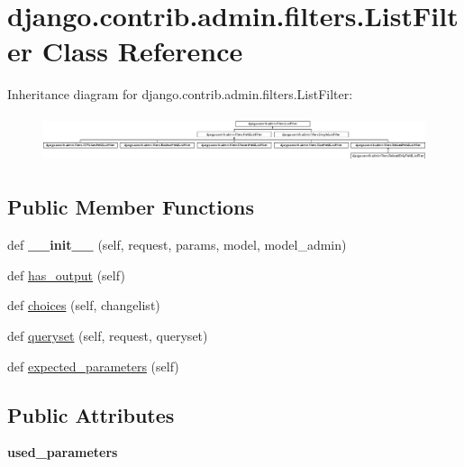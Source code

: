 \hypertarget{classdjango_1_1contrib_1_1admin_1_1filters_1_1_list_filter}{}\section{django.\+contrib.\+admin.\+filters.\+List\+Filter Class Reference}
\label{classdjango_1_1contrib_1_1admin_1_1filters_1_1_list_filter}
Inheritance diagram for django.\+contrib.\+admin.\+filters.\+List\+Filter\+:\begin{figure}[H]
\begin{center}
\leavevmode
\includegraphics[height=1.391304cm]{classdjango_1_1contrib_1_1admin_1_1filters_1_1_list_filter}
\end{center}
\end{figure}
\subsection*{Public Member Functions}
\begin{DoxyCompactItemize}
\item 
\mbox{\label{classdjango_1_1contrib_1_1admin_1_1filters_1_1_list_filter_a70915241f3547958fcfac26a5fae3cc6}} 
def {\bfseries \+\_\+\+\_\+init\+\_\+\+\_\+} (self, request, params, model, model\+\_\+admin)
\item 
def \mbox{\hyperlink{classdjango_1_1contrib_1_1admin_1_1filters_1_1_list_filter_aa658bcb5f1bd4970a7fe7e78a2a8f457}{has\+\_\+output}} (self)
\item 
def \mbox{\hyperlink{classdjango_1_1contrib_1_1admin_1_1filters_1_1_list_filter_ac69878c2063911721147847a6e8bc5d5}{choices}} (self, changelist)
\item 
def \mbox{\hyperlink{classdjango_1_1contrib_1_1admin_1_1filters_1_1_list_filter_aed1f92493175185d1714cb763f6efa08}{queryset}} (self, request, queryset)
\item 
def \mbox{\hyperlink{classdjango_1_1contrib_1_1admin_1_1filters_1_1_list_filter_a164a6d28582db5c168810ee9fdbee4b3}{expected\+\_\+parameters}} (self)
\end{DoxyCompactItemize}
\subsection*{Public Attributes}
\begin{DoxyCompactItemize}
\item 
\mbox{\label{classdjango_1_1contrib_1_1admin_1_1filters_1_1_list_filter_aa3a0b86f3d0e796a9eb82166cb05102a}} 
{\bfseries used\+\_\+parameters}
\end{DoxyCompactItemize}
